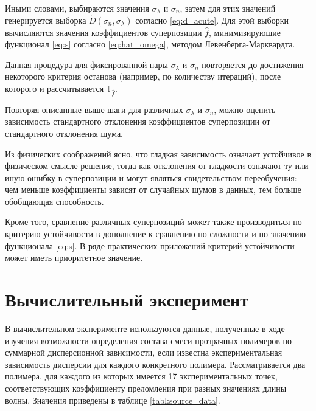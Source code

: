 \documentclass[11pt,a4paper]{article}
\theoremstyle{definition}
\begin{document}
Иными словами, выбираются значения $\sigma_{\lambda}$ и $\sigma_n$, затем для этих
значений генерируется выборка $\acute{D}(\sigma_n, \sigma_{\lambda})$ согласно
\eqref{eq:d_acute}. Для этой выборки вычисляются значения коэффициентов суперпозиции
$\hat{f}$, минимизирующие функционал \eqref{eq:s} согласно \eqref{eq:hat_omega},
методом Левенберга-Марквардта.

Данная процедура для фиксированной пары $\sigma_{\lambda}$ и $\sigma_n$ повторяется
до достижения некоторого критерия останова (например, по количеству итераций),
после которого и рассчитывается $\mathbb{T}_{\hat{f}}$.

Повторяя описанные выше шаги для различных $\sigma_{\lambda}$ и $\sigma_n$, можно
оценить зависимость стандартного отклонения коэффициентов суперпозиции от
стандартного отклонения шума.

Из физических соображений ясно, что гладкая зависимость означает устойчивое в
физическом смысле решение, тогда как отклонения от гладкости означают
ту или иную ошибку в суперпозиции и могут являться свидетельством переобучения:
чем меньше коэффициенты зависят от случайных шумов в данных, тем больше обобщающая
способность.

Кроме того, сравнение различных суперпозиций может также производиться по
критерию устойчивости в дополнение к сравнению по сложности и по значению
функционала \eqref{eq:s}. В ряде практических приложений критерий устойчивости
может иметь приоритетное значение.

\section{Вычислительный эксперимент}

В вычислительном эксперименте используются данные, полученные в ходе
изучения возможности определения состава смеси прозрачных
полимеров по суммарной дисперсионной зависимости, если известна экспериментальная
зависимость дисперсии для каждого конкретного полимера. Рассматривается два
полимера, для каждого из которых имеется 17 экспериментальных точек,
соответствующих коэффициенту преломления при разных значениях длины волны.
Значения приведены в таблице \ref{tabl:source_data}.
\end{document}
